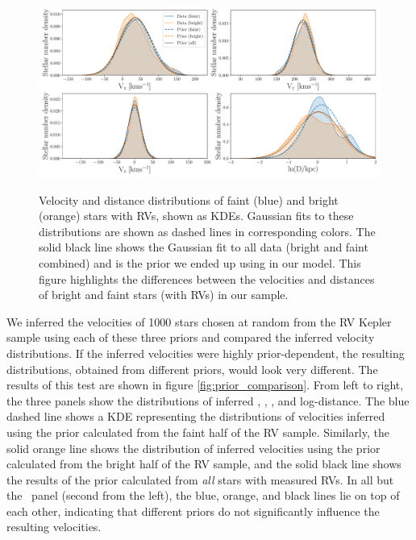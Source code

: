 \begin{figure}[ht!]
\caption{
    Velocity and distance distributions of faint (blue) and bright (orange)
    stars with RVs, shown as KDEs.
    Gaussian fits to these distributions are shown as dashed lines in
    corresponding colors.
    The solid black line shows the Gaussian fit to all data (bright and faint
    combined) and is the prior we ended up using in our model.
    This figure highlights the differences between the velocities and
    distances of bright and faint stars (with RVs) in our sample.
}
  \centering
    \includegraphics[width=1\textwidth]{prior_distributions}
\label{fig:prior_distributions}
\end{figure}
We inferred the velocities of 1000 stars chosen at random from the
RV Kepler sample using each of these three priors and compared the
inferred velocity distributions.
If the inferred velocities were highly prior-dependent, the resulting
distributions, obtained from different priors, would look very different.
The results of this test are shown in figure \ref{fig:prior_comparison}.
From left to right, the three panels show the distributions of inferred \vx,
\vy, \vz, and log-distance.
The blue dashed line shows a KDE representing the distributions of velocities
inferred using the prior calculated from the faint half of the RV sample.
Similarly, the solid orange line shows the distribution of inferred velocities
using the prior calculated from the bright half of the RV sample, and the
solid black line shows the results of the prior calculated from {\it all}
stars with measured RVs.
In all but the \vy\ panel (second from the left), the blue, orange,
and black lines lie on top of each other, indicating that different priors do
not significantly influence the resulting velocities.

